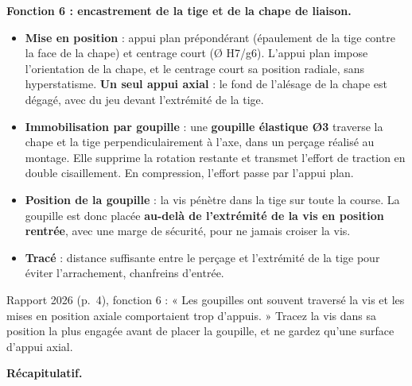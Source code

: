 \documentclass[11pt,a4paper]{article}
\providecommand{\tightlist}{\setlength{\itemsep}{0pt}\setlength{\parskip}{0pt}}
\begin{document}
\textbf{Fonction 6 : encastrement de la tige et de la chape de liaison.}

\begin{itemize}
\tightlist
\item
  \textbf{Mise en position} : appui plan prépondérant (épaulement de la tige contre la face de la chape) et centrage court (Ø H7/g6). L'appui plan impose l'orientation de la chape, et le centrage court sa position radiale, sans hyperstatisme. \textbf{Un seul appui axial} : le fond de l'alésage de la chape est dégagé, avec du jeu devant l'extrémité de la tige.
\item
  \textbf{Immobilisation par goupille} : une \textbf{goupille élastique Ø3} traverse la chape et la tige perpendiculairement à l'axe, dans un perçage réalisé au montage. Elle supprime la rotation restante et transmet l'effort de traction en double cisaillement. En compression, l'effort passe par l'appui plan.
\item
  \textbf{Position de la goupille} : la vis pénètre dans la tige sur toute la course. La goupille est donc placée \textbf{au-delà de l'extrémité de la vis en position rentrée}, avec une marge de sécurité, pour ne jamais croiser la vis.
\item
  \textbf{Tracé} : distance suffisante entre le perçage et l'extrémité de la tige pour éviter l'arrachement, chanfreins d'entrée.
\end{itemize}

\begin{piege}

Rapport 2026 (p.~4), fonction 6 : « Les goupilles ont souvent traversé la vis et les mises en position axiale comportaient trop d'appuis. » Tracez la vis dans sa position la plus engagée avant de placer la goupille, et ne gardez qu'une surface d'appui axial.

\end{piege}

\textbf{Récapitulatif.}
\end{document}
